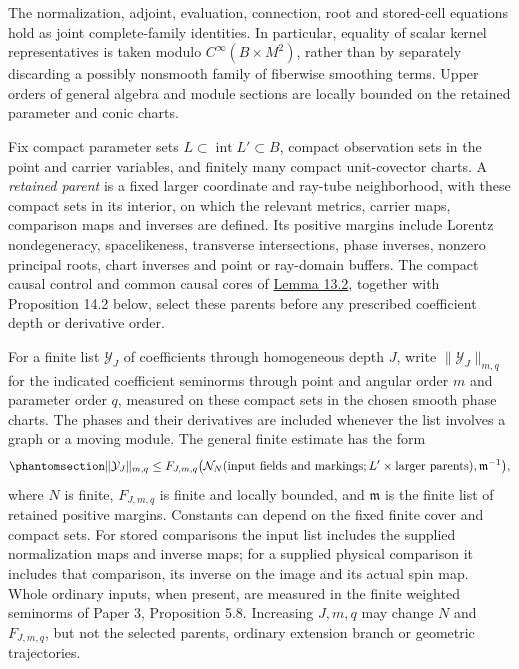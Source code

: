 \documentclass[
  english,
  11pt,
  reqno]{amsart}
\begin{document}
The normalization, adjoint, evaluation, connection, root and stored-cell
equations hold as joint complete-family identities. In particular,
equality of scalar kernel representatives is taken modulo
\(C^\infty(B\times M^2)\), rather than by separately discarding a
possibly nonsmooth family of fiberwise smoothing terms. Upper orders of
general algebra and module sections are locally bounded on the retained
parameter and conic charts.

Fix compact parameter sets \(L\subset\operatorname{int}L'\subset B\),
compact observation sets in the point and carrier variables, and
finitely many compact unit-covector charts. A \emph{retained parent} is
a fixed larger coordinate and ray-tube neighborhood, with these compact
sets in its interior, on which the relevant metrics, carrier maps,
comparison maps and inverses are defined. Its positive margins include
Lorentz nondegeneracy, spacelikeness, transverse intersections, phase
inverses, nonzero principal roots, chart inverses and point or
ray-domain buffers. The compact causal control and common causal cores
of \hyperref[lem:family-compact-cauchy-parents]{Lemma 13.2}, together
with Proposition 14.2 below, select these parents before any prescribed
coefficient depth or derivative order.

For a finite list \(\mathcal Y_J\) of coefficients through homogeneous
depth \(J\), write \(\|\mathcal Y_J\|_{m,q}\) for the indicated
coefficient seminorms through point and angular order \(m\) and
parameter order \(q\), measured on these compact sets in the chosen
smooth phase charts. The phases and their derivatives are included
whenever the list involves a graph or a moving module. The general
finite estimate has the form
\begin{equation}\protect\phantomsection\label{eq:family-full-comparison-estimate}{
\|\mathcal Y_J\|_{m,q}
\le
F_{J,m,q}\bigl(
\mathcal N_N(\text{input fields and markings};L'\times\text{larger parents}),
\mathfrak m^{-1}\bigr),
}\end{equation} where \(N\) is finite, \(F_{J,m,q}\) is finite and
locally bounded, and \(\mathfrak m\) is the finite list of retained
positive margins. Constants can depend on the fixed finite cover and
compact sets. For stored comparisons the input list includes the
supplied normalization maps and inverse maps; for a supplied physical
comparison it includes that comparison, its inverse on the image and its
actual spin map. Whole ordinary inputs, when present, are measured in
the finite weighted seminorms of Paper 3, Proposition 5.8. Increasing
\(J,m,q\) may change \(N\) and \(F_{J,m,q}\), but not the selected
parents, ordinary extension branch or geometric trajectories.
\end{document}

